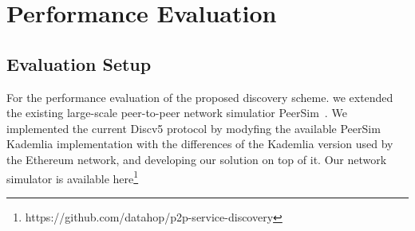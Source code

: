 
\section{Performance Evaluation}
\label{sec:eval}
%





\subsection{Evaluation Setup}

For the  performance evaluation of the proposed discovery scheme. we extended the existing  large-scale peer-to-peer network simulatior PeerSim~\cite{p2p09-peersim}.
We implemented the current Discv5 protocol by modyfing the available PeerSim Kademlia implementation with the differences of the Kademlia version used by the Ethereum network, and developing our solution on top of it. 
Our network simulator is available here\footnote{https://github.com/datahop/p2p-service-discovery}

